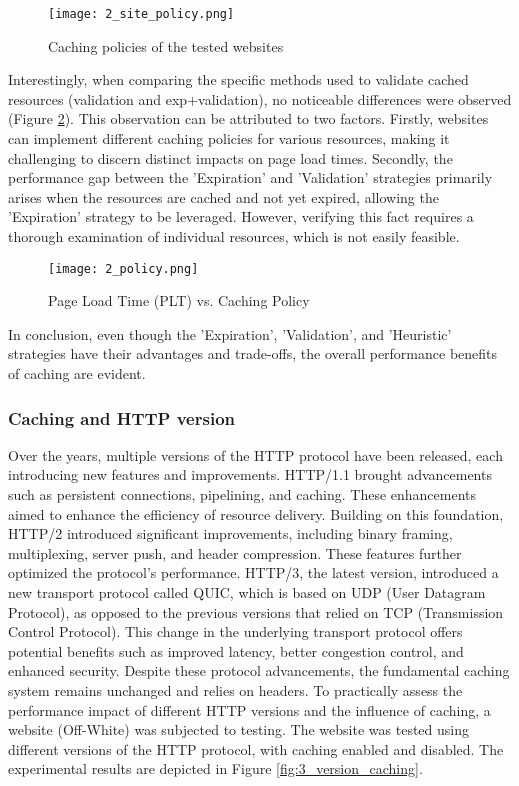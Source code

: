     \begin{figure}[H]
        \centering
        \texttt{[image: 2\_site\_policy.png]}
        \caption{\small Caching policies of the tested websites}
        \label{fig:2_site_policy}
    \end{figure}

Interestingly, when comparing the specific methods used to validate cached resources (validation and exp+validation), no noticeable differences were observed (Figure \ref{fig:2_policy}).
This observation can be attributed to two factors. Firstly, websites can implement different caching policies for various resources, making it challenging 
to discern distinct impacts on page load times. Secondly, the performance gap between the 'Expiration' and 'Validation' strategies primarily arises 
when the resources are cached and not yet expired, allowing the 'Expiration' strategy to be leveraged. However, verifying this fact requires a thorough 
examination of individual resources, which is not easily feasible.

    \begin{figure}[H]
        \centering
        \texttt{[image: 2\_policy.png]}
        \caption{\small Page Load Time (PLT) vs. Caching Policy}
        \label{fig:2_policy}
    \end{figure}

In conclusion, even though the 'Expiration', 'Validation', and 'Heuristic' strategies have their advantages and trade-offs, the overall performance 
benefits of caching are evident.

\subsubsection{Caching and HTTP version}
Over the years, multiple versions of the HTTP protocol have been released, each introducing new features and improvements. 
HTTP/1.1 brought advancements such as persistent connections, pipelining, and caching. These enhancements aimed to enhance the efficiency 
of resource delivery. Building on this foundation, HTTP/2 introduced significant improvements, including binary framing, multiplexing, server push, 
and header compression. These features further optimized the protocol's performance.
HTTP/3, the latest version, introduced a new transport protocol called QUIC, which is based on UDP (User Datagram Protocol), as opposed to 
the previous versions that relied on TCP (Transmission Control Protocol). This change in the underlying transport protocol offers potential benefits such as 
improved latency, better congestion control, and enhanced security.
Despite these protocol advancements, the fundamental caching system remains unchanged and relies on headers.
To practically assess the performance impact of different HTTP versions and the influence of caching, a website (Off-White) was subjected to 
testing. The website was tested using different versions of the HTTP protocol, with caching enabled and disabled. The experimental results are depicted 
in Figure \ref{fig:3_version_caching}.

